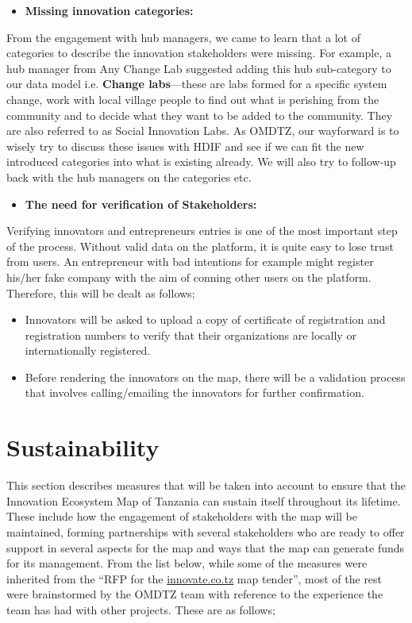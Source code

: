 \documentclass[a4paper,12pt,twoside]{article}
\begin{document}
\begin{itemize}
    \item \textbf{Missing innovation categories:}
\end{itemize}
From the engagement with hub managers, we came to learn that a lot of categories to describe the innovation stakeholders were missing. For example, a hub manager from Any Change Lab suggested adding this hub sub-category to our data model i.e. \textbf{Change labs}---these are labs formed for a specific system change, work with local village people to find out what is perishing from the community and to decide what they want to be added to the community. They are also referred to as Social Innovation Labs. As OMDTZ, our wayforward is to wisely try to discuss these issues with HDIF and see if we can fit the new introduced categories into what is existing already. We will also try to follow-up back with the hub managers on the categories etc.

\begin{itemize}
    \item \textbf{The need for verification of Stakeholders:}
\end{itemize}
Verifying innovators and entrepreneurs entries is one of the most important step of the process. Without valid data on the platform, it is quite easy to lose trust from users. An entrepreneur with bad intentions for example might register his/her fake company with the aim of conning other users on the platform. Therefore, this will be dealt as follows;
    \begin{itemize}
        \begin{itemize}
            \item Innovators will be asked to upload a copy of certificate of registration and registration numbers to verify that their organizations are locally or internationally registered.
            \item Before rendering the innovators on the map, there will be a validation process that involves calling/emailing the innovators for further confirmation.
        \end{itemize}
    \end{itemize}

\newpage
\section{Sustainability}
This section describes measures that will be taken into account to ensure that the Innovation Ecosystem Map of Tanzania can sustain itself throughout its lifetime. These include how  the engagement of stakeholders with the map will be maintained, forming partnerships with several stakeholders who are ready to offer support in several aspects for the map and ways that the map can generate funds for its management. From the list below, while some of the measures were inherited from the “RFP for the \href{innovate.co.tz}{innovate.co.tz} map tender”, most of the rest were brainstormed by the OMDTZ team with reference to the experience the team has had with other projects. These are as follows;
\end{document}
